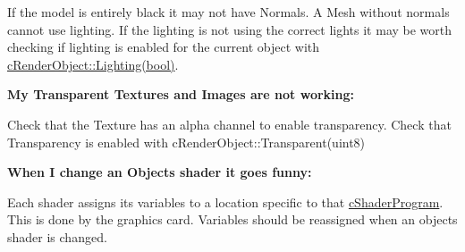  If the model is entirely black it may not have Normals. A Mesh without normals cannot use lighting. If the lighting is not using the correct lights it may be worth checking if lighting is enabled for the current object with \hyperlink{classc_render_object_a67191d0fe8aceaa10052a542b3c34650}{cRenderObject::Lighting(bool)}. \par
 {\bfseries  My Transparent Textures and Images are not working:} \par
 Check that the Texture has an alpha channel to enable transparency. Check that Transparency is enabled with cRenderObject::Transparent(uint8) \par
 {\bfseries When I change an Objects shader it goes funny:} \par
 Each shader assigns its variables to a location specific to that \hyperlink{classc_shader_program}{cShaderProgram}. This is done by the graphics card. Variables should be reassigned when an objects shader is changed. 